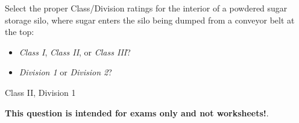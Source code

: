 

Select the proper Class/Division ratings for the interior of a powdered sugar storage silo, where sugar enters the silo being dumped from a conveyor belt at the top:

\begin{itemize}
\item{} {\it Class I}, {\it Class II}, or {\it Class III}?
\vskip 10pt
\item{} {\it Division 1} or {\it Division 2}?
\end{itemize}







Class II, Division 1







{\bf This question is intended for exams only and not worksheets!}.



